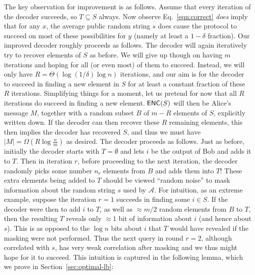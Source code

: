 The key observation for improvement is as follows. Assume that every iteration of the decoder succeeds, so $T\subseteq S$ always. Now observe Eq.~\eqref{eqn:correct} {\em does} imply that for any $x$, the average public random string $s$ does cause the protocol to succeed on most of these possibilities for $y$ (namely at least a $1-\delta$ fraction).
Our improved decoder roughly proceeds as follows. The decoder will again iteratively try to recover elements of $S$ as before. We will give up though on having $m$ iterations and hoping for all (or even most) of them to succeed. Instead, we will only have $R = \Theta(\log(1/\delta)\log n)$ iterations, and our aim is for the decoder to succeed in finding a new element in $S$ for at least a constant fraction of these $R$ iterations. Simplifying things for a moment, let us pretend for now that all $R$ iterations do succeed in finding a new element. $\textsf{ENC}(S)$ will then be Alice's message $M$, together with a random subset $B$ of $m-R$ elements of $S$, explicitly written down. If the decoder can then recover these $R$ remaining elements, this then implies the decoder has recovered $S$, and thus we must have $|M| = \Omega(R\log \frac nm)$ as desired. The decoder proceeds as follows. Just as before, initially the decoder starts with $T = \emptyset$ and lets $i$ be the output of Bob and adds it to $T$. Then in iteration $r$, before proceeding to the next iteration, the decoder randomly picks some number $n_r$ elements from $B$ and adds them into $T$! These extra elements being added to $T$ should be viewed ``random noise'' to mask information about the random string $s$ used by $\mathcal{A}$. For intuition, as an extreme example, suppose the iteration $r=1$ succeeds in finding some $i\in S$. If the decoder were then to add $i$ to $T$, as well as $\approx m/2$ random elements from $B$ to $T$, then the resulting $T$ reveals only $\approx 1$ bit of information about $i$ (and hence about $s$). This is as opposed to the $\log n$ bits about $i$ that $T$ would have revealed if the masking were not performed. Thus the next query in round $r=2$, although correlated with $s$, has very weak correlation after masking and we thus might hope for it to succeed. This intuition is captured in the following lemma, which we prove in Section~\ref{sec:optimal-lb}:
